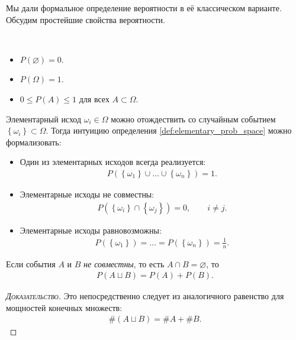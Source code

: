 \documentclass[../main.tex]{subfiles}
\begin{document}
Мы дали формальное определение вероятности в её классическом варианте. Обсудим простейшие свойства вероятности.

\begin{prop}\
 \begin{itemize}
  \item $ P(\varnothing)=0 $.
  \item $ P(\Omega) = 1 $.
  \item $ 0 \leqslant P(A) \leqslant 1 $ для всех $ A \subset \Omega $.
 \end{itemize}
\end{prop}

\begin{remrk}
 Элементарный исход $ \omega_i \in \Omega $ можно отождествить со случайным событием $ \left\{ \omega_i \right\} \subset \Omega $. Тогда интуицию определения \ref{def:elementary_prob_space} можно формализовать:
 \begin{itemize}
  \item Один из элементарных исходов всегда реализуется:
   \begin{align*}
    P(\left\{ \omega_1 \right\} \cup \ldots \cup \left\{ \omega_n \right\}) = 1.
   \end{align*}
  \item Элементарные исходы не совместны:
   \begin{align*}
    P(\left\{ \omega_i \right\} \cap \left\{ \omega_j \right\}) = 0, \qquad i \neq j.
   \end{align*}
  \item Элементарные исходы равновозможны:
   \begin{align*}
    P(\left\{ \omega_1 \right\}) = \ldots = P(\left\{ \omega_n \right\}) = \frac{1}{n}.
   \end{align*}
 \end{itemize}
\end{remrk}

\begin{prop}
 Если события $ A $ и $ B $ \textit{не совместны}, то есть $ A \cap B = \varnothing $, то
 \begin{align}
  \label{eq:elem_prob_additivity}
  P(A \sqcup B) = P(A) + P(B).
 \end{align}
\end{prop}
\begin{proof}[\normalfont\textsc{Доказательство}]
 Это непосредственно следует из аналогичного равенство для мощностей конечных множеств:
 \begin{align*}
  \#(A\sqcup B) = \#A+\# B.
 \end{align*}
\end{proof}
\end{document}
